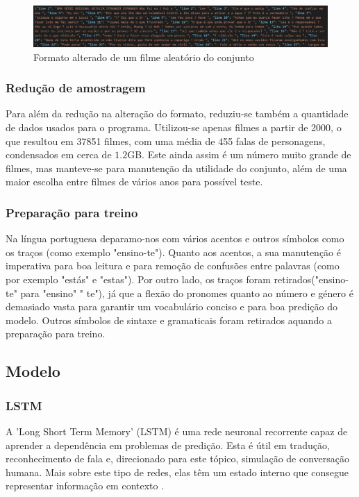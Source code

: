 \documentclass{article}
\begin{document}
\begin{figure}
	\centering
    \includegraphics[scale=0.28]{images/json.png}
    \caption{Formato alterado de um filme aleatório do conjunto}
    \label{jsonimg}
\end{figure}

\subsubsection{Redução de amostragem}
Para além da redução na alteração do formato, reduziu-se também a quantidade de dados usados para o programa. Utilizou-se apenas filmes a partir de 2000, o que resultou em 37851 filmes, com uma média de 455 falas de personagens, condensados em cerca de $1.2$GB. Este ainda assim é um número muito grande de filmes, mas manteve-se para manutenção da utilidade do conjunto, além de uma maior escolha entre filmes de vários anos para possível teste.

\subsubsection{Preparação para treino}
Na língua portuguesa deparamo-nos com vários acentos e outros símbolos como os traços (como exemplo "ensino-te"). Quanto aos acentos, a sua manutenção é imperativa para boa leitura e para remoção de confusões entre palavras (como por exemplo "estás" e "estas"). Por outro lado, os traços foram retirados("ensino-te" para "ensino" " te"), já que a flexão do pronomes quanto ao número e género é demasiado vasta para garantir um vocabulário conciso e para boa predição do modelo. Outros símbolos de sintaxe e gramaticais foram retirados aquando a preparação para treino.


\subsection{Modelo}


\subsubsection{LSTM}
A 'Long Short Term Memory' (LSTM) é uma rede neuronal recorrente capaz de aprender a dependência em problemas de predição. Esta é útil em tradução, reconhecimento de fala e, direcionado para este tópico, simulação de conversação humana. Mais sobre este tipo de redes, elas têm um estado interno que consegue representar informação em contexto \cite{bengio1994learning}.
\end{document}
